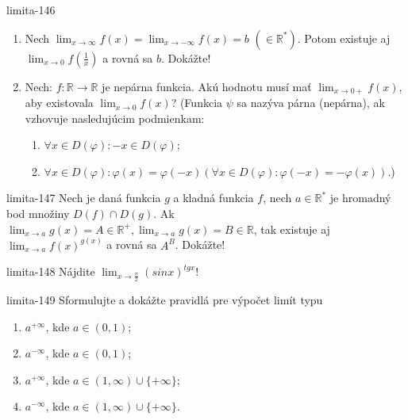 \begin{defproblem}{limita-146}
\begin{enumerate}
\item Nech $\lim_{x \rightarrow \infty} f(x)=\lim_{x \rightarrow -\infty} f(x)=b$  $(\in \mathbb{R^*})$. Potom existuje aj $\lim_{x \rightarrow 0} f(\frac{1}{x})$  a rovná sa $b$. Dokážte!
\item Nech: $f: \mathbb{R} \rightarrow \mathbb{R}$ je nepárna funkcia. Akú hodnotu musí mať $\lim_{x \rightarrow 0+} f(x)$, aby existovala $\lim_{x \rightarrow 0} f(x)$? (Funkcia $\psi$ sa nazýva párna (nepárna), ak vzhovuje nasledujúcim podmienkam:
\begin{enumerate}
\item $\forall x \in D(\varphi): -x \in D(\varphi)$;
\item $\forall x \in D(\varphi): \varphi(x)=\varphi(-x) (\forall x \in D(\varphi): \varphi(-x)=-\varphi(x))$.)
\end{enumerate}
\end{enumerate}
\end{defproblem}

\begin{defproblem}{limita-147}
Nech je daná funkcia $g$ a kladná funkcia $f$, nech $a \in \mathbb{R^*}$ je hromadný bod množiny $D(f)\cap D(g)$. Ak $\lim_{x \rightarrow a} g(x)=A \in \mathbb{R^+},\lim_{x \rightarrow a} g(x)=B \in \mathbb{R}$, tak existuje aj $\lim_{x \rightarrow a} f(x)^{g(x)}$ a rovná sa $A^B$. Dokážte!
\end{defproblem}

\begin{defproblem}{limita-148}
Nájdite $\lim_{x \rightarrow \frac{\pi}{2}} (sin x)^{tg x}$!
\end{defproblem}

\begin{defproblem}{limita-149}
Sformulujte a dokážte pravidlá pre výpočet limít typu
\begin{multicols}{2}
\begin{enumerate}
    \item $a^{+\infty}$, kde $a \in (0,1)$;
    \item $a^{-\infty}$, kde $a \in (0,1)$;
    \item $a^{+\infty}$, kde $a \in (1,\infty) \cup \{+\infty \}$;
    \item $a^{-\infty}$, kde $a \in (1,\infty) \cup \{+\infty \}$.
\end{enumerate}
\end{multicols}
\end{defproblem}


